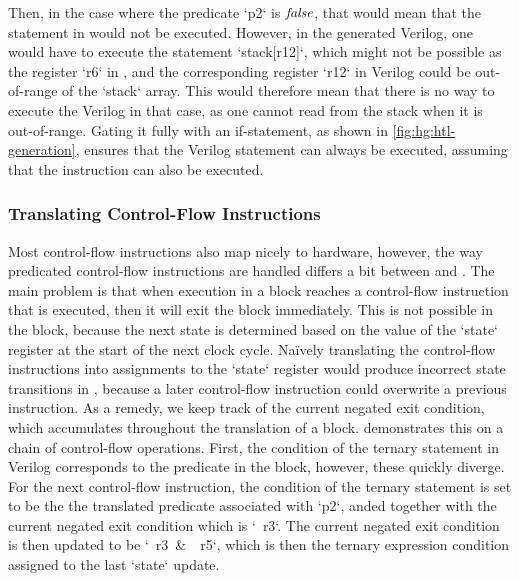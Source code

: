 \noindent Then, in the case where the predicate \rtlinline`p2` is $\mathit{false}$,
that would mean that the statement in \rtlsubpar{} would not be executed.
However, in the generated Verilog, one would have to execute the statement
\veriloginline`stack[r12]`, which might not be possible as the register
\rtlinline`r6` in \rtlsubpar{}, and the corresponding register
\veriloginline`r12` in Verilog could be out-of-range of the
\veriloginline`stack` array.  This would therefore mean that there is no way to
execute the Verilog in that case, as one cannot read from the stack when it is
out-of-range.  Gating it fully with an if-statement, as shown in
\cref{fig:hg:htl-generation}, ensures that the Verilog statement can always be
executed, assuming that the \rtlsubpar{} instruction can also be executed.

\subsubsection{Translating Control-Flow Instructions}%
\label{sec:hg:translating-control-flow-instructions}

Most control-flow instructions also map nicely to hardware, however, the way
predicated control-flow instructions are handled differs a bit between
\rtlsubpar{} and \htl{}.  The main problem is that when execution in a
\rtlsubpar{} block reaches a control-flow instruction that is executed, then it
will exit the block immediately.  This is not possible in the \htl{} block,
because the next state is determined based on the value of the
\veriloginline`state` register at the start of the next clock cycle.  Na\"ively
translating the control-flow instructions into assignments to the
\veriloginline`state` register would produce incorrect state transitions in
\htl{}, because a later control-flow instruction could overwrite a previous
instruction.  As a remedy, we keep track of the current negated exit condition,
which accumulates throughout the translation of a block.
 demonstrates this on a chain of control-flow
operations.  First, the condition of the ternary statement in Verilog
corresponds to the predicate in the block, however, these quickly diverge.  For
the next control-flow instruction, the condition of the ternary statement is set
to be the the translated predicate associated with \rtlinline`p2`, anded
together with the current negated exit condition which is \veriloginline`~r3`.
The current negated exit condition is then updated to be
\veriloginline`~r3 & ~r5`, which is then the ternary expression condition
assigned to the last \veriloginline`state` update.

